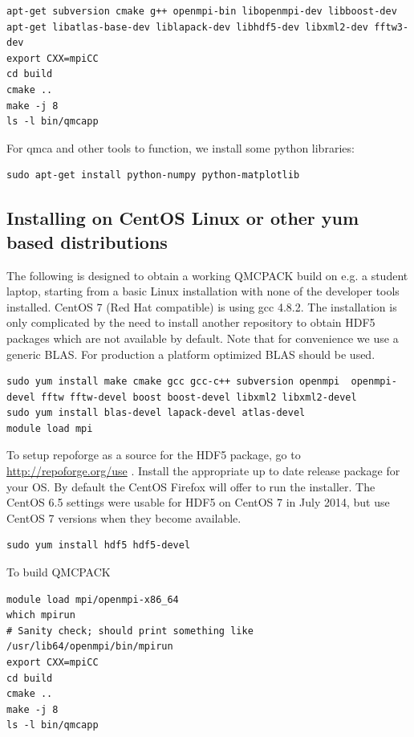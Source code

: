 \begin{verbatim}
apt-get subversion cmake g++ openmpi-bin libopenmpi-dev libboost-dev
apt-get libatlas-base-dev liblapack-dev libhdf5-dev libxml2-dev fftw3-dev
export CXX=mpiCC
cd build
cmake ..
make -j 8
ls -l bin/qmcapp
\end{verbatim}

For qmca and other tools to function, we install some python libraries:
\begin{verbatim}
sudo apt-get install python-numpy python-matplotlib
\end{verbatim}

\subsection{Installing on CentOS Linux or other yum based distributions}

The following is designed to obtain a working QMCPACK build on e.g. a
student laptop, starting from a basic Linux installation with none of
the developer tools installed. CentOS 7 (Red Hat compatible) is using
gcc 4.8.2. The installation is only complicated by the need to install
another repository to obtain HDF5 packages which are not available by
default. Note that for convenience we use a generic BLAS. For
production a platform optimized BLAS should be used.

\begin{verbatim}
sudo yum install make cmake gcc gcc-c++ subversion openmpi  openmpi-devel fftw fftw-devel boost boost-devel libxml2 libxml2-devel
sudo yum install blas-devel lapack-devel atlas-devel
module load mpi 

\end{verbatim}

To setup repoforge as a source for the HDF5 package, go to
\url{http://repoforge.org/use} . Install the appropriate up to date
release package for your OS. By default the CentOS Firefox will offer
to run the installer. The CentOS 6.5 settings were usable for HDF5 on
CentOS 7 in July 2014, but use CentOS 7 versions when they become
available.

\begin{verbatim}
sudo yum install hdf5 hdf5-devel 
\end{verbatim}

To build QMCPACK
\begin{verbatim}
module load mpi/openmpi-x86_64
which mpirun
# Sanity check; should print something like   /usr/lib64/openmpi/bin/mpirun
export CXX=mpiCC
cd build
cmake ..
make -j 8
ls -l bin/qmcapp
\end{verbatim}

